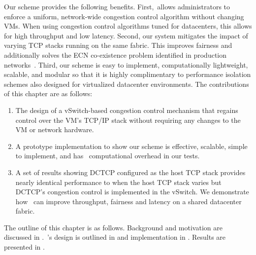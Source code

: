 Our scheme provides the following benefits. First,~\acdc allows
administrators to enforce a uniform, network-wide congestion control algorithm without changing VMs. When using congestion control algorithms tuned for 
datacenters, this allows for high throughput and low latency. Second,
our system mitigates the impact of varying TCP stacks running on the same fabric. This improves fairness and additionally
solves the ECN co-existence problem identified in production networks~\cite{wu2012tuning,judd2015nsdi}. 
Third, our scheme is easy to implement, computationally lightweight, scalable, and modular so that it is highly complimentary to
performance isolation schemes also designed for virtualized datacenter environments.
The contributions of this chapter are as follows:
\begin{enumerate}
\item The design of a vSwitch-based congestion control mechanism that regains control over the VM's TCP/IP stack
without requiring any changes to the VM or network hardware. 
\item A prototype implementation to show our scheme is effective, scalable, simple to implement, and has~ computational overhead in our tests.
\item A set of results showing DCTCP configured as the host TCP stack provides nearly identical
performance to when the host TCP stack varies but DCTCP's congestion control is implemented in the vSwitch. We demonstrate how~\acdc{} can improve
throughput, fairness and latency on a shared datacenter fabric.
\end{enumerate}

The outline of this chapter is as follows. Background and motivation are discussed in .~\acdc{}'s design is outlined in  and
implementation in . Results are presented in .

